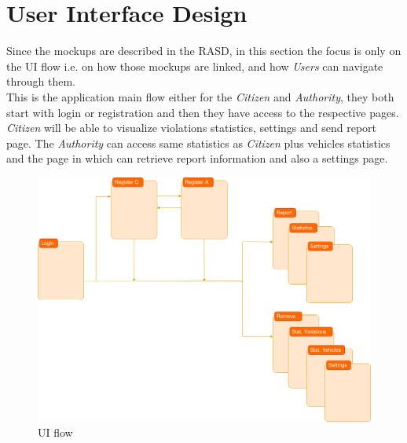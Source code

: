 \documentclass{article}
\begin{document}
\clearpage


\section{User Interface Design}
Since the mockups are described in the RASD, in this section the focus is only on the UI flow i.e. on how
those mockups are linked, and how \textit{Users} can navigate through them.
\\
This is the application main flow either for the \textit{Citizen} and \textit{Authority}, they both start with login 
or registration and then they have access to the respective pages. \textit{Citizen} will be able to 
visualize violations statistics, settings and send report page. The \textit{Authority} can access 
same statistics as \textit{Citizen} plus vehicles statistics and the page in which can retrieve report 
information and also a settings page.

\begin{figure}[H]
    \centering
    \includegraphics[scale=0.3]{img/UX_flow.png}
    \caption{UI flow}
\end{figure}

\end{document}
